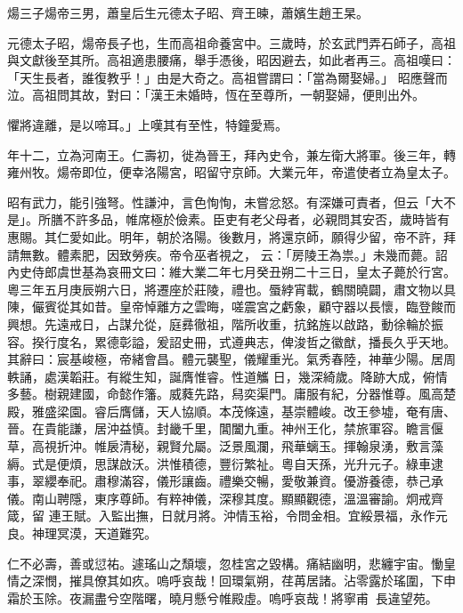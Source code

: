 
\begin{pinyinscope}

 煬三子煬帝三男，蕭皇后生元德太子昭、齊王暕，蕭嬪生趙王杲。



 元德太子昭，煬帝長子也，生而高祖命養宮中。三歲時，於玄武門弄石師子，高祖與文獻後至其所。高祖適患腰痛，舉手憑後，昭因避去，如此者再三。高祖嘆曰：「天生長者，誰復教乎！」由是大奇之。高祖嘗謂曰：「當為爾娶婦。」
 昭應聲而泣。高祖問其故，對曰：「漢王未婚時，恆在至尊所，一朝娶婦，便則出外。



 懼將違離，是以啼耳。」上嘆其有至性，特鐘愛焉。



 年十二，立為河南王。仁壽初，徙為晉王，拜內史令，兼左衛大將軍。後三年，轉雍州牧。煬帝即位，便幸洛陽宮，昭留守京師。大業元年，帝遣使者立為皇太子。



 昭有武力，能引強弩。性謙沖，言色恂恂，未嘗忿怒。有深嫌可責者，但云「大不是」。所膳不許多品，帷席極於儉素。臣吏有老父母者，必親問其安否，歲時皆有惠賜。其仁愛如此。明年，朝於洛陽。後數月，將還京師，願得少留，帝不許，拜請無數。體素肥，因致勞疾。帝令巫者視之，
 云：「房陵王為祟。」未幾而薨。詔內史侍郎虞世基為哀冊文曰：維大業二年七月癸丑朔二十三日，皇太子薨於行宮。粵三年五月庚辰朔六日，將遷座於莊陵，禮也。蜃綍宵載，鶴關曉闢，肅文物以具陳，儼賓從其如昔。皇帝悼離方之雲晦，嗟震宮之虧象，顧守器以長懷，臨登餕而興想。先遠戒日，占謀允從，庭彞徹祖，階所收重，抗銘旌以啟路，動徐輪於振容。揆行度名，累德彰謚，爰詔史冊，式遵典志，俾浚哲之徽猷，播長久乎天地。其辭曰：宸基峻極，帝緒會昌。體元襲聖，儀耀重光。氣秀春陸，神華少陽。居周軼誦，處漢韜莊。有縱生知，誕膺惟睿。性道觿
 日，幾深綺歲。降跡大成，俯情多藝。樹親建國，命懿作籓。威蕤先路，舄奕渠門。庸服有紀，分器惟尊。風高楚殿，雅盛梁園。睿后膺儲，天人協順。本茂條遠，基崇體峻。改王參墟，奄有唐、晉。在貴能謙，居沖益慎。封畿千里，閶闔九重。神州王化，禁旅軍容。瞻言偃草，高視折沖。帷扆清秘，親賢允屬。泛景風瀾，飛華螭玉。揮翰泉湧，敷言藻縟。式是便煩，思謀啟沃。洪惟積德，豐衍繁祉。粵自天孫，光升元子。綠車逮事，翠纓奉祀。肅穆滿容，儀形讓齒。禮樂交暢，愛敬兼資。優游養德，恭己承儀。南山聘隱，東序尊師。有粹神儀，深穆其度。顯顯觀德，溫溫審諭。炯戒齊箴，留
 連王賦。入監出撫，日就月將。沖情玉裕，令問金相。宜綏景福，永作元良。神理冥漠，天道難究。



 仁不必壽，善或愆祐。遽瑤山之頹壞，忽桂宮之毀構。痛結幽明，悲纏宇宙。慟皇情之深憫，摧具僚其如疚。嗚呼哀哉！回環氣朔，荏苒居諸。沾零露於瑤圍，下申霜於玉除。夜漏盡兮空階曙，曉月懸兮帷殿虛。嗚呼哀哉！將寧甫，長違望苑。




\end{pinyinscope}
